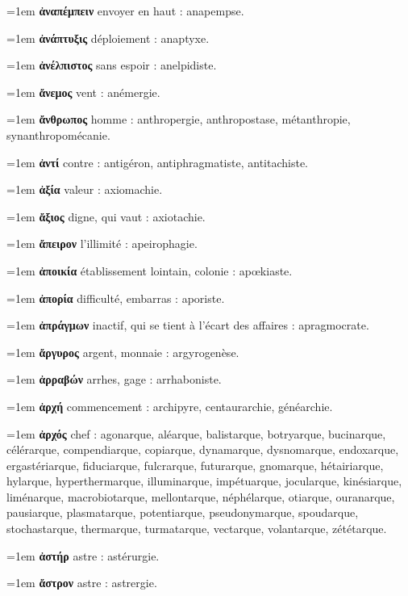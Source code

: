 \hangindent=1em \textbf{ἀναπέμπειν} envoyer en haut : anapempse.\par
\hangindent=1em \textbf{ἀνάπτυξις} déploiement : anaptyxe.\par
\hangindent=1em \textbf{ἀνέλπιστος} sans espoir : anelpidiste.\par
\hangindent=1em \textbf{ἄνεμος} vent : anémergie.\par
\hangindent=1em \textbf{ἄνθρωπος} homme : anthropergie, anthropostase, métanthropie, synanthropomécanie.\par
\hangindent=1em \textbf{ἀντί} contre : antigéron, antiphragmatiste, antitachiste.\par
\hangindent=1em \textbf{ἀξία} valeur : axiomachie.\par
\hangindent=1em \textbf{ἄξιος} digne, qui vaut : axiotachie.\par
\hangindent=1em \textbf{ἄπειρον} l'illimité : apeirophagie.\par
\hangindent=1em \textbf{ἀποικία} établissement lointain, colonie : apœkiaste.\par
\hangindent=1em \textbf{ἀπορία} difficulté, embarras : aporiste.\par
\hangindent=1em \textbf{ἀπράγμων} inactif, qui se tient à l'écart des affaires : apragmocrate.\par
\hangindent=1em \textbf{ἄργυρος} argent, monnaie : argyrogenèse.\par
\hangindent=1em \textbf{ἀρραβών} arrhes, gage : arrhaboniste.\par
\hangindent=1em \textbf{ἀρχή} commencement : archipyre, centaurarchie, généarchie.\par
\hangindent=1em \textbf{ἀρχός} chef : agonarque, aléarque, balistarque, botryarque, bucinarque, célérarque, compendiarque, copiarque, dynamarque, dysnomarque, endoxarque, ergastériarque, fiduciarque, fulcrarque, futurarque, gnomarque, hétairiarque, hylarque, hyperthermarque, illuminarque, impétuarque, jocularque, kinésiarque, liménarque, macrobiotarque, mellontarque, néphélarque, otiarque, ouranarque, pausiarque, plasmatarque, potentiarque, pseudonymarque, spoudarque, stochastarque, thermarque, turmatarque, vectarque, volantarque, zététarque.\par
\hangindent=1em \textbf{ἀστήρ} astre : astérurgie.\par
\hangindent=1em \textbf{ἄστρον} astre : astrergie.\par
